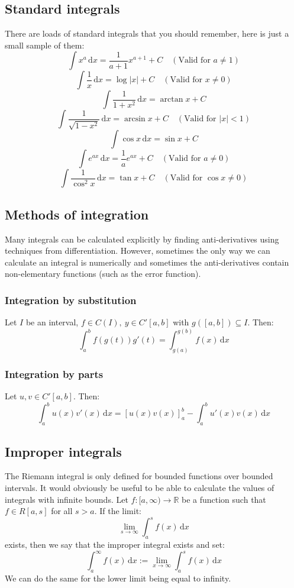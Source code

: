 \documentclass[12pt]{article}
\begin{document}
\subsection*{Standard integrals}
There are loads of standard integrals that you should remember, here is just a small sample of them:
\[\int x^a\,\text{d}x=\frac{1}{a+1}x^{a+1}+C\quad (\text{Valid for }a\ne1)\]
\[\int \frac{1}{x}\,\text{d}x=\log{|x|}+C\quad (\text{Valid for }x\ne0)\]
\[\int \frac{1}{1+x^2}\,\text{d}x=\arctan{x}+C\]
\[\int \frac{1}{\sqrt{1-x^2}}\,\text{d}x=\arcsin{x}+C\quad (\text{Valid for }|x|<1)\]
\[\int \cos{x}\,\text{d}x=\sin{x}+C\]
\[\int e^{ax}\,\text{d}x=\frac{1}{a}e^{ax}+C\quad (\text{Valid for }a\ne0)\]
\[\int \frac{1}{\cos^2{x}}\,\text{d}x=\tan{x}+C\quad (\text{Valid for }\cos{x}\ne0)\]
\subsection*{Methods of integration}
Many integrals can be calculated explicitly by finding anti-derivatives using techniques from differentiation. However, sometimes the only way we can calculate an integral is numerically and sometimes the anti-derivatives contain non-elementary functions (such as the error function).
\subsubsection*{Integration by substitution}
Let \(I\) be an interval, \(f\in C(I),\ y\in C'[a,b]\) with \(g([a,b])\subseteq I\). Then:
\[\int^b_af(g(t))g'(t)=\int^{g(b)}_{g(a)}f(x)\,\text{d}x\]
\subsubsection*{Integration by parts}
Let \(u,v\in C'[a,b]\). Then:
\[\int^b_au(x)v'(x)\,\text{d}x=\left[u(x)v(x)\right]^b_a-\int^b_au'(x)v(x)\,\text{d}x\]
\subsection*{Improper integrals}
The Riemann integral is only defined for bounded functions over bounded intervals. It would obviously be useful to be able to calculate the values of integrals with infinite bounds. Let \(f:[a,\infty)\to\mathbb{R}\) be a function such that \(f\in R[a,s]\) for all \(s>a\). If the limit:
\[\lim_{s\to\infty}\int^s_af(x)\,\text{d}x\]
exists, then we say that the improper integral exists and set:
\[\int^\infty_af(x)\,\text{d}x:=\lim_{x\to\infty}\int^s_af(x)\,\text{d}x\]
We can do the same for the lower limit being equal to infinity.
\end{document}
